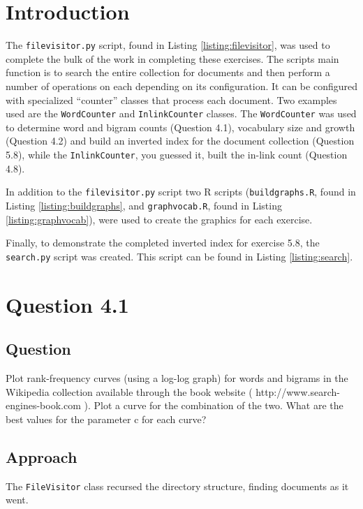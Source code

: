 \section{Introduction}
The \texttt{filevisitor.py} script, found in Listing \ref{listing:filevisitor}, was used to complete the bulk of the work in completing these exercises.  The scripts main function is to search the entire collection for documents and then perform a number of operations on each depending on its configuration.  It can be configured with specialized ``counter'' classes that process each document.  Two examples used are the \texttt{WordCounter} and \texttt{InlinkCounter} classes.  The \texttt{WordCounter} was used to determine word and bigram counts (Question 4.1), vocabulary size and growth (Question 4.2) and build an inverted index for the document collection (Question 5.8), while the \texttt{InlinkCounter}, you guessed it, built the in-link count (Question 4.8).

In addition to the \texttt{filevisitor.py} script two R scripts (\texttt{buildgraphs.R}, found in Listing \ref{listing:buildgraphs}, and \texttt{graphvocab.R}, found in Listing \ref{listing:graphvocab}), were used to create the graphics for each exercise.

Finally, to demonstrate the completed inverted index for exercise 5.8, the \texttt{search.py} script was created.  This script can be found in Listing \ref{listing:search}.

\section{Question 4.1}

\subsection{Question}
Plot rank-frequency curves (using a log-log graph) for words and bigrams in the Wikipedia collection available through the book website ( http://www.search-engines-book.com ). Plot a curve for the combination of the two. What are the best values for the parameter c for each curve?

\subsection{Approach}
The \texttt{FileVisitor} class recursed the directory structure, finding documents as it went.



